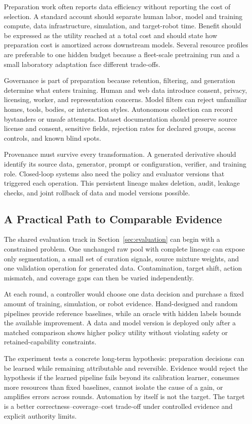 Preparation work often reports data efficiency without reporting the cost of selection. A standard account should separate human labor, model and training compute, data infrastructure, simulation, and target-robot time. Benefit should be expressed as the utility reached at a total cost and should state how preparation cost is amortized across downstream models. Several resource profiles are preferable to one hidden budget because a fleet-scale pretraining run and a small laboratory adaptation face different trade-offs.

Governance is part of preparation because retention, filtering, and generation determine what enters training. Human and web data introduce consent, privacy, licensing, worker, and representation concerns. Model filters can reject unfamiliar homes, tools, bodies, or interaction styles. Autonomous collection can record bystanders or unsafe attempts. Dataset documentation should preserve source license and consent, sensitive fields, rejection rates for declared groups, access controls, and known blind spots.

Provenance must survive every transformation. A generated derivative should identify its source data, generator, prompt or configuration, verifier, and training role. Closed-loop systems also need the policy and evaluator versions that triggered each operation. This persistent lineage makes deletion, audit, leakage checks, and joint rollback of data and model versions possible.

\subsection{A Practical Path to Comparable Evidence}

The shared evaluation track in Section~\ref{sec:evaluation} can begin with a constrained problem. One unchanged raw pool with complete lineage can expose only segmentation, a small set of curation signals, source mixture weights, and one validation operation for generated data. Contamination, target shift, action mismatch, and coverage gaps can then be varied independently.

At each round, a controller would choose one data decision and purchase a fixed amount of training, simulation, or robot evidence. Hand-designed and random pipelines provide reference baselines, while an oracle with hidden labels bounds the available improvement. A data and model version is deployed only after a matched comparison shows higher policy utility without violating safety or retained-capability constraints.

The experiment tests a concrete long-term hypothesis: preparation decisions can be learned while remaining attributable and reversible. Evidence would reject the hypothesis if the learned pipeline fails beyond its calibration learner, consumes more resources than fixed baselines, cannot isolate the cause of a gain, or amplifies errors across rounds. Automation by itself is not the target. The target is a better correctness--coverage--cost trade-off under controlled evidence and explicit authority limits.
